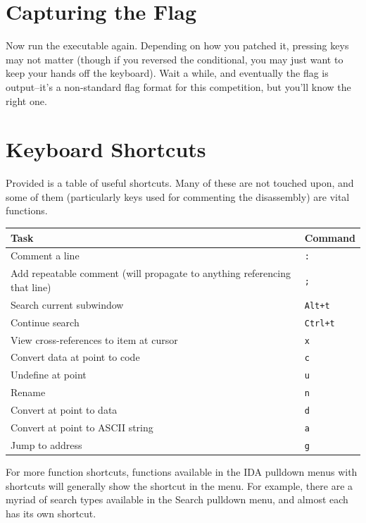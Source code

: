 \documentclass[11pt]{article}
\begin{document}
\section{Capturing the Flag}
\label{sec-7}
Now run the executable again. Depending on how you patched it, pressing keys
may not matter (though if you reversed the conditional, you may just want to
keep your hands off the keyboard). Wait a while, and eventually the flag is
output--it's a non-standard flag format for this competition, but you'll know
the right one.
\section{Keyboard Shortcuts}
\label{sec-8}
Provided is a table of useful shortcuts. Many of these are not touched upon,
and some of them (particularly keys used for commenting the disassembly) are
vital functions.

\begin{center}
\begin{tabular}{ll}
\hline
Task & Command\\
\hline
Comment a line & \texttt{:}\\
Add repeatable comment (will propagate to anything referencing that line) & \texttt{;}\\
Search current subwindow & \texttt{Alt+t}\\
Continue search & \texttt{Ctrl+t}\\
View cross-references to item at cursor & \texttt{x}\\
Convert data at point to code & \texttt{c}\\
Undefine at point & \texttt{u}\\
Rename & \texttt{n}\\
Convert at point to data & \texttt{d}\\
Convert at point to ASCII string & \texttt{a}\\
Jump to address & \texttt{g}\\
\hline
\end{tabular}
\end{center}

For more function shortcuts, functions available in the IDA pulldown menus
with shortcuts will generally show the shortcut in the menu. For example,
there are a myriad of search types available in the Search pulldown menu, and
almost each has its own shortcut.
\end{document}
